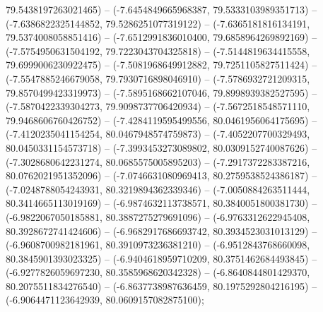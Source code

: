 79.5438197263021465) -- (-7.6454849665968387, 79.5333103989351713) -- (-7.6386822325144852, 79.5286251077319122) -- (-7.6365181816134191, 79.5374008058851416) -- (-7.6512991836010400, 79.6858964269892169) -- (-7.5754950631504192, 79.7223043704325818) -- (-7.5144819634415558, 79.6999006230922475) -- (-7.5081968649912882, 79.7251105827511424) -- (-7.5547885246679058, 79.7930716898046910) -- (-7.5786932721209315, 79.8570499423319973) -- (-7.5895168662107046, 79.8998939382527595) -- (-7.5870422339304273, 79.9098737706420934) -- (-7.5672518548571110, 79.9468606760426752) -- (-7.4284119595499556, 80.0461956064175695) -- (-7.4120235041154254, 80.0467948574759873) -- (-7.4052207700329493, 80.0450331154573718) -- (-7.3993453273089802, 80.0309152740087626) -- (-7.3028680642231274, 80.0685575005895203) -- (-7.2917372283387216, 80.0762021951352096) -- (-7.0746631080969413, 80.2759538524386187) -- (-7.0248788054243931, 80.3219894362339346) -- (-7.0050884263511444, 80.3414665113019169) -- (-6.9874632113738571, 80.3840051800381730) -- (-6.9822067050185881, 80.3887275279691096) -- (-6.9763312622945408, 80.3928672741424606) -- (-6.9682917686693742, 80.3934523031013129) -- (-6.9608700982181961, 80.3910973236381210) -- (-6.9512843768660098, 80.3845901393023325) -- (-6.9404618959710209, 80.3751462684493845) -- (-6.9277826059697230, 80.3585968620342328) -- (-6.8640844801429370, 80.2075511834276540) -- (-6.8637738987636459, 80.1975292804216195) -- (-6.9064471123642939, 80.0609157082875100);
